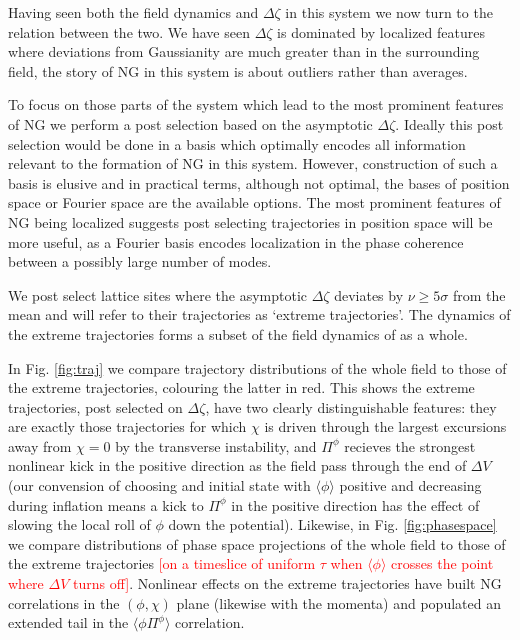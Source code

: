 Having seen both the field dynamics and $\Delta\zeta$ in this system we now turn to the relation between the two.
We have seen $\Delta\zeta$ is dominated by localized features where deviations from Gaussianity are much greater than in the surrounding field, the story of NG in this system is about outliers rather than averages.

To focus on those parts of the system which lead to the most prominent features of NG we perform a post selection based on the asymptotic $\Delta\zeta$.
Ideally this post selection would be done in a basis which optimally encodes all information relevant to the formation of NG in this system.
However, construction of such a basis is elusive and in practical terms, although not optimal, the bases of position space or Fourier space are the available options. 
The most prominent features of NG being localized suggests post selecting trajectories in position space will be more useful, as a Fourier basis encodes localization in the phase coherence between a possibly large number of modes.

We post select lattice sites where the asymptotic $\Delta\zeta$ deviates by $\nu \ge 5 \sigma$ from the mean and will refer to their trajectories as `extreme trajectories'.
The dynamics of the extreme trajectories forms a subset of the field dynamics of as a whole.

In Fig. \ref{fig:traj} we compare trajectory distributions of the whole field to those of the extreme trajectories, colouring the latter in red. This shows the extreme trajectories, post selected on $\Delta\zeta$, have two clearly distinguishable features: they are exactly those trajectories for which $\chi$ is driven through the largest excursions away from $\chi=0$ by the transverse instability, and $\Pi^\phi$ recieves the strongest nonlinear kick in the positive direction as the field pass through the end of $\Delta V$ (our convension of choosing and initial state with $\langle\phi\rangle$ positive and decreasing during inflation means a kick to $\Pi^\phi$ in the positive direction has the effect of slowing the local roll of $\phi$ down the potential). Likewise, in Fig. \ref{fig:phasespace} we compare distributions of phase space projections of the whole field to those of the extreme trajectories \textcolor{red}{[on a timeslice of uniform $\tau$ when $\langle\phi\rangle$ crosses the point where $\Delta V$ turns off]}.
Nonlinear effects on the extreme trajectories have built NG correlations in the $(\phi,\chi)$ plane (likewise with the momenta) and populated an extended tail in the $\langle\phi\Pi^\phi\rangle$ correlation.


